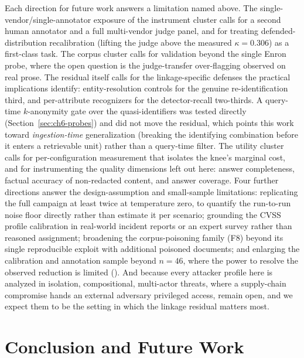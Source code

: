 \documentclass[12pt,a4paper]{report}
\begin{document}
Each direction for future work answers a limitation named above. The single-vendor/single-annotator
exposure of the instrument cluster calls for a second human annotator and a full multi-vendor
judge panel, and for treating defended-distribution recalibration (lifting the judge above the
measured $\kappa = 0.306$) as a first-class task. The corpus cluster calls for validation
beyond the single Enron probe, where the open question is the judge-transfer over-flagging
observed on real prose. The residual itself calls for the linkage-specific defenses the practical
implications identify: entity-resolution controls for the genuine re-identification third, and
per-attribute recognizers for the detector-recall two-thirds. A query-time $k$-anonymity gate over
the quasi-identifiers was tested directly (Section~\ref{sec:ch6-probes}) and did not move the
residual, which points this work toward \emph{ingestion-time} generalization (breaking the
identifying combination before it enters a retrievable unit) rather than a query-time filter. The utility cluster calls for
per-configuration measurement that isolates the knee's marginal cost, and for instrumenting the
quality dimensions left out here: answer completeness, factual accuracy of non-redacted content,
and answer coverage. Four further directions answer the design-assumption and small-sample
limitations: replicating the full campaign at least twice at temperature zero, to quantify the
run-to-run noise floor directly rather than estimate it per scenario; grounding the CVSS profile
calibration in real-world incident reports or an expert survey rather than reasoned assignment;
broadening the corpus-poisoning family (F8) beyond its single reproducible exploit with additional
poisoned documents; and enlarging the calibration and annotation sample beyond $n = 46$, where the
power to resolve the observed reduction is limited (). And because every attacker
profile here is analyzed in isolation, compositional, multi-actor threats, where a
supply-chain compromise hands an external adversary privileged access, remain open, and we
expect them to be the setting in which the linkage residual matters most.


\chapter{Conclusion and Future Work}
\label{ch:conclusion}
\end{document}
